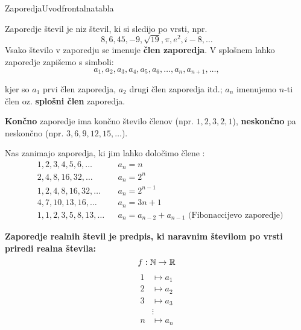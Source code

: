 \begin{priprava}{}{}{Zaporedja}{Uvod}{frontalna}{tabla}



Zaporedje števil je niz števil, ki si sledijo po vrsti, npr. 
$$ 8, 6, 45, -9, \sqrt{19}, \pi, e^2, i-8, \ldots $$
Vsako število v zaporedju se imenuje \textbf{člen zaporedja}. V splošnem lahko zaporedje zapišemo s simboli:
$$ a_1, a_2, a_3, a_4, a_5, a_6, \ldots, a_n, a_{n+1}, \ldots, $$

kjer so $ a_1 $ prvi člen zaporedja, $ a_2 $ drugi člen zaporedja itd.; $ a_n $ imenujemo $n$-ti člen oz. \textbf{splošni člen} zaporedja.

\textbf{Končno} zaporedje ima končno število členov (npr. $ 1, 2, 3, 2, 1 $), \textbf{neskončno} pa neskončno (npr. $ 3, 6, 9, 12, 15, \ldots $).

Nas zanimajo zaporedja, ki jim lahko določimo člene :
\begin{align*}
    & 1, 2, 3, 4, 5, 6, \ldots && a_n = n \\
    & 2, 4, 8, 16, 32, \ldots && a_n = 2^n \\
    & 1, 2, 4, 8, 16, 32, \ldots && a_n = 2^{n-1} \\
    & 4, 7, 10, 13, 16, \ldots && a_n = 3n + 1 \\
    & 1, 1, 2, 3, 5, 8, 13, \ldots && a_n = a_{n-2} + a_{n-1} \text{ (Fibonaccijevo zaporedje)}
\end{align*}

\textbf{Zaporedje realnih števil je predpis, ki naravnim številom po vrsti priredi realna števila:
$$ f: \mathbb{N} \rightarrow \mathbb{R} $$}
\begin{equation*}
    \begin{split}
        1 & \longmapsto a_1 \\
        2 & \longmapsto a_2 \\
        3 & \longmapsto a_3 \\
        & \vdots \\
        n & \longmapsto a_n \\
    \end{split}
\end{equation*}


\end{priprava}
